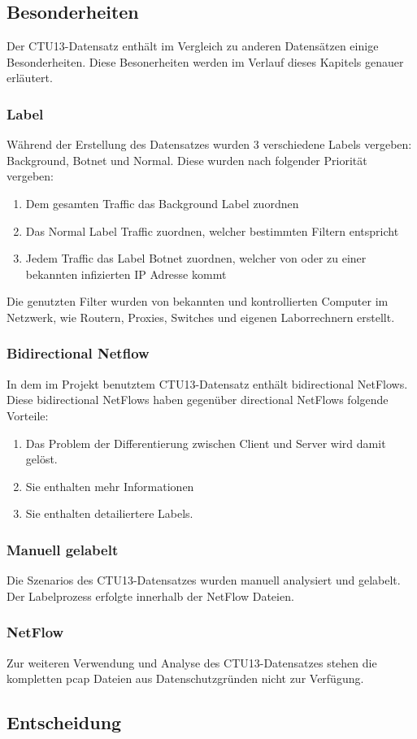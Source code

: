 \documentclass[main.tex]{subfiles}
\begin{document}
\subsection{Besonderheiten}
Der CTU13-Datensatz enthält im Vergleich zu anderen Datensätzen einige Besonderheiten. Diese Besonerheiten werden im Verlauf dieses Kapitels genauer erläutert.
\subsubsection{Label}
Während der Erstellung des Datensatzes wurden 3 verschiedene Labels vergeben: Background, Botnet und Normal. Diese wurden nach folgender Priorität vergeben: 
\begin{center}
\begin{enumerate}
\item Dem gesamten Traffic das Background Label zuordnen
\item Das Normal Label Traffic zuordnen, welcher bestimmten Filtern entspricht
\item Jedem Traffic das Label Botnet zuordnen, welcher von oder zu einer bekannten infizierten IP Adresse kommt
\end{enumerate}
\end{center}
Die genutzten Filter wurden von bekannten und kontrollierten Computer im Netzwerk, wie Routern, Proxies, Switches und eigenen Laborrechnern erstellt.
\subsubsection{Bidirectional Netflow}
In dem im Projekt benutztem CTU13-Datensatz enthält bidirectional NetFlows. Diese bidirectional NetFlows haben gegenüber directional NetFlows folgende Vorteile: 
\begin{center}
\begin{enumerate}
\item Das Problem der Differentierung zwischen Client und Server wird damit gelöst.
\item Sie enthalten mehr Informationen
\item Sie enthalten detailiertere Labels.
\end{enumerate}
\end{center}
\subsubsection{Manuell gelabelt}
Die Szenarios des CTU13-Datensatzes wurden manuell analysiert und gelabelt. Der Labelprozess erfolgte innerhalb der NetFlow Dateien.
\subsubsection{NetFlow}
Zur weiteren Verwendung und Analyse des CTU13-Datensatzes stehen die kompletten pcap Dateien aus Datenschutzgründen nicht zur Verfügung.
\subsection{Entscheidung}
\end{document}
